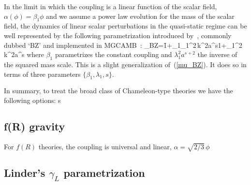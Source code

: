 In the limit in which the coupling is a linear function of the scalar field, $\alpha(\phi)=\beta_1\phi$ and we assume a power law evolution for the mass of the scalar field,  the dynamics of linear scalar perturbations in the quasi-static regime can be well represented  by the following parametrization introduced by~\cite{Bertschinger:2008zb}, commonly dubbed `BZ' and implemented in MGCAMB~\cite{Hojjati:2011ix,MGCAMB}:
\be\label{mu_BZ_gen}
\mu_{\rm BZ}=\f{1+\beta_1\lambda_1^2\,k^2a^s}{1+\lambda_1^2\,k^2a^s}
\ee
where $\beta_1$ parametrizes the constant coupling and $\lambda_1^2 a^{s+2}$ the inverse of the squared mass scale. This is a slight generalization of~(\ref{mu_BZ}). It does so in terms of three parameters $\{\beta_1,\lambda_1,s\}$. 

In summary, to treat the broad class of Chameleon-type theories we have the following options:
s

\subsection{f(R) gravity}
For $f(R)$ theories, the coupling is universal and linear, $\alpha=\sqrt{2/3}\,\phi$
\subsection{Linder's $\gamma_L$ parametrization}




